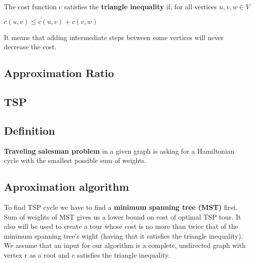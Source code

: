 \documentclass[runningheads, a4paper]{llncs}
\begin{document}
        The cost function c satisfies the \textbf{triangle inequality} if, for all vertices $u,v,w \in V$
        
        \begin{center}
            $c(u,v)\leq c(u,v) + c(v,w)$
        \end{center}
        
        It means that adding intermediate steps between some vertices will never decrease the cost.
        \subsection{Approximation Ratio}
        
        \subsection{TSP}
        
        \subsection{Definition}
        \textbf{Traveling salesman problem} in a given graph is asking for a Hamiltonian cycle with the smallest possible sum of weights.
        
        \subsection{Aproximation algorithm}
        
        To find TSP cycle we have to find a \textbf{minimum spanning tree (MST)} first. Sum of weights of MST gives us a lower bound on cost of optimal TSP tour. It also will be used to create a tour whose cost is no more than twice that of the minimum spanning tree's wight (having that it satisfies the triangle inequality). We assume that an input for our algorithm is a complete, undirected graph with vertex r as a root and c satisfies the triangle inequality.
        
\end{document}
